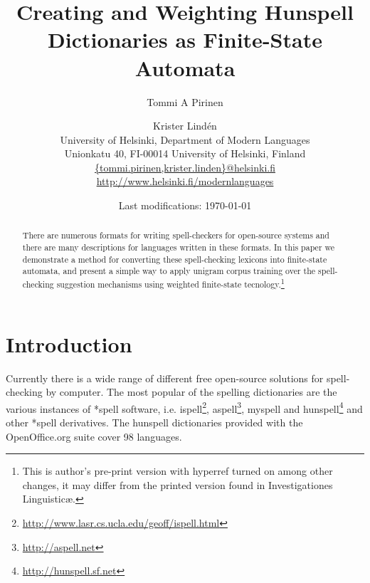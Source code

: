 \documentclass[postprint]{flammie}
\begin{document}
\title{Creating and Weighting Hunspell Dictionaries as Finite-State Automata
    }

\author{Tommi A Pirinen \and Krister Lind\'{e}n\\
University of Helsinki, Department of Modern Languages\\
    Unionkatu 40, FI-00014 University of Helsinki, Finland\\
    \url{{tommi.pirinen,krister.linden}@helsinki.fi}\\
    \url{http://www.helsinki.fi/modernlanguages}}

\date{Last modifications: \today}

\maketitle

\begin{abstract}
  There are numerous formats for writing spell-checkers for
  open-source systems and there are many descriptions for languages
  written in these formats. In this paper we
  demonstrate a method for converting these spell-checking lexicons
  into finite-state automata, and present a simple way to apply unigram
  corpus training over the spell-checking suggestion mechanisms using
  weighted finite-state tecnology.\footnote{This is author's pre-print version with hyperref turned on among other
    changes, it may differ from the printed version found in Investigationes
Linguistic\ae{}.}
\end{abstract}


\section{Introduction}
\label{sec:introduction}

Currently there is a wide range of different free open-source
solutions for spell-checking by computer. The most popular of the spelling
dictionaries are the various instances of *spell software, i.e.
ispell\footnote{\url{http://www.lasr.cs.ucla.edu/geoff/ispell.html}},
aspell\footnote{\url{http://aspell.net}}, myspell and
hunspell\footnote{\url{http://hunspell.sf.net}} and other *spell
derivatives. The hunspell dictionaries
provided with the OpenOffice.org suite cover 98 languages.
\end{document}
